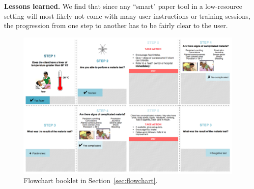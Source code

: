 \documentclass{sig-alternate}
\begin{document}
\textbf{Lessons learned.}
We find that since any ``smart" paper tool in a low-resource setting will most likely not come with many user instructions or training sessions, the progression from one step to another has to be fairly clear to the user.

\begin{figure}
\centering
\includegraphics[width=\linewidth]{img/flowchart.png}
\caption{Flowchart booklet in Section~\ref{sec:flowchart}.}
\label{fig:flowchart}
\end{figure}





\end{document}
